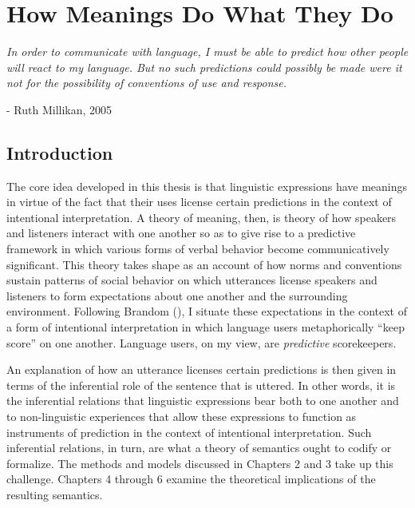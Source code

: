 
\chapter{How Meanings Do What They Do}
\renewcommand{\epigraphrule}{0pt}
\setlength{\epigraphwidth}{4.5in}
\epigraph{\textit{In order to communicate with language, I must be able to predict how other people will react to my language. But no such predictions could possibly be made were it not for the possibility of conventions of use and response.}}{- Ruth Millikan, 2005}

\section{Introduction}

The core idea developed in this thesis is that linguistic expressions have meanings in virtue of the fact that their uses license certain predictions in the context of intentional interpretation. A theory of meaning, then, is theory of how speakers and listeners interact with one another so as to give rise to a predictive framework in which various forms of verbal behavior become communicatively significant. This theory takes shape as an account of how norms and conventions sustain patterns of social behavior on which utterances license speakers and listeners to form expectations about one another and the surrounding environment. Following Brandom (\citeyear{Brandom:1994}), I situate these expectations in the context of a form of intentional interpretation in which language users metaphorically ``keep score'' on one another. Language users, on my view, are \textit{predictive} scorekeepers.

An explanation of how an utterance licenses certain predictions is then given in terms of the inferential role of the sentence that is uttered. In other words, it is the inferential relations that linguistic expressions bear both to one another and to non-linguistic experiences that allow these expressions to function as instruments of prediction in the context of intentional interpretation. Such inferential relations, in turn, are what a theory of semantics ought to codify or formalize. The methods and models discussed in Chapters 2 and 3 take up this challenge. Chapters 4 through 6 examine the theoretical implications of the resulting semantics. 

